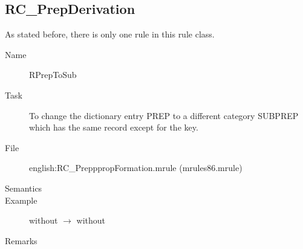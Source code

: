 \subsection{RC\_PrepDerivation}
As stated before, there is only one rule in this rule class.

\begin{description}
\item[Name] RPrepToSub
\item[Task] To change the dictionary entry PREP to a different 
category SUBPREP which has the same record except for the key.
\item[File] english:RC\_PrepppropFormation.mrule (mrules86.mrule)
\item[Semantics]
\item[Example] without $\rightarrow$ without
\item[Remarks]
\end{description}




